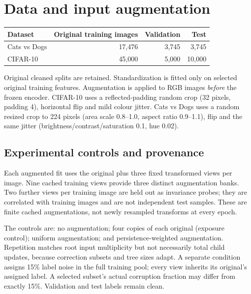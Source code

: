 \documentclass[11pt,a4paper]{article}
\begin{document}
\section{Data and input augmentation}
\begin{center}\begin{tabular}{lrrr}\toprule
Dataset & Original training images & Validation & Test\\\midrule
Cats vs Dogs &17,476&3,745&3,745\\
CIFAR-10 &45,000&5,000&10,000\\\bottomrule
\end{tabular}\end{center}
Original cleaned splits are retained. Standardization is fitted only on selected original training features. Augmentation is applied to RGB images \emph{before} the frozen encoder. CIFAR-10 uses a reflected-padding random crop (32 pixels, padding 4), horizontal flip and mild colour jitter. Cats vs Dogs uses a random resized crop to 224 pixels (area scale 0.8--1.0, aspect ratio 0.9--1.1), flip and the same jitter (brightness/contrast/saturation 0.1, hue 0.02).

\subsection{Experimental controls and provenance}
Each augmented fit uses the original plus three fixed transformed views per image. Nine cached training views provide three distinct augmentation banks. Two further views per training image are held out as invariance probes; they are correlated with training images and are not independent test samples. These are finite cached augmentations, not newly resampled transforms at every epoch.

The controls are: no augmentation; four copies of each original (exposure control); uniform augmentation; and persistence-weighted augmentation. Repetition matches root input multiplicity but not necessarily total child updates, because correction subsets and tree sizes adapt. A separate condition assigns 15\% label noise in the full training pool; every view inherits its original's assigned label. A selected subset's actual corruption fraction may differ from exactly 15\%. Validation and test labels remain clean.
\end{document}
